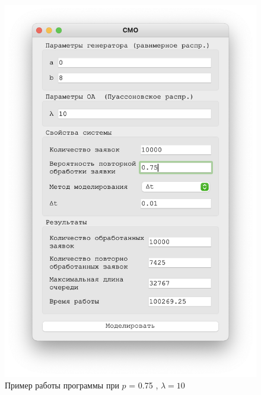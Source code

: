 \begin{figure}[!htb]
\begin{minipage}{0.55\textwidth}
      \includegraphics[width=1\linewidth]{10-75-t}
    \end{minipage}
    \caption{Пример работы программы при $p$ = 0.75 , $\lambda = 10$}
 \end{figure}


